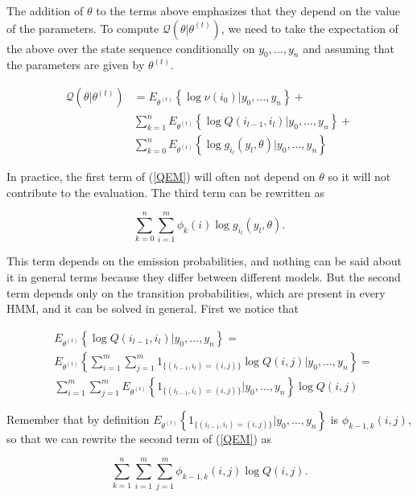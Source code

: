 \documentclass[12pt]{article}
\begin{document}
\begin{appendices}
    The addition of $\theta$ to the terms above emphasizes that they
    depend on the value of the parameters. To compute
    $\mathcal{Q}(\theta|\theta^{(t)})$, we need to take the
    expectation of the above over the state sequence
    conditionally on $y_0, \ldots, y_n$ and assuming that the parameters
    are given by $\theta^{(t)}$.

    \begin{align}
      \mathcal{Q}(\theta|\theta^{(t)}) &=
      E_{\theta^{(t)}} \left\{ \log \nu(i_0)
      \big| y_0, \ldots, y_n \right\} + \nonumber \\
      &\sum_{k=1}^n E_{\theta^{(t)}} \left\{
        \log Q(i_{l-1}, i_l)\big| y_0,
            \ldots, y_n \right\} + \label{QEM} \\
      &\sum_{k=0}^n E_{\theta^{(t)}} \left\{
        \log g_{i_l}(y_l, \theta) \big| y_0, \ldots, y_n \right\}
        \nonumber
    \end{align}

    In practice, the first term of (\ref{QEM}) will often not depend
    on $\theta$ so it will not contribute to the evaluation.
    The third term can be rewritten as

    $$\sum_{k=0}^n\sum_{i=1}^m \phi_k(i) \log g_{i_l}(y_l, \theta).$$

    This term depends on the emission probabilities, and nothing
    can be said about it in general terms because they differ
    between different models. But the second term depends only on
    the transition probabilities, which are present in every HMM,
    and it can be solved in general. First we notice that

    \begin{align*}
      &E_{\theta^{(t)}} \left\{ \log Q(i_{l-1}, i_l)
      \big| y_0, \ldots, y_n \right\} = \\
      &E_{\theta^{(t)}} \left\{ \sum_{i=1}^m\sum_{j=1}^m 
      1_{\{(i_{l-1}, i_l) = (i,j)\}} \log Q(i,j)
      \big| y_0, \ldots, y_n \right\} = \\
      &\sum_{i=1}^m\sum_{j=1}^m E_{\theta^{(t)}} \left\{
      1_{\{(i_{l-1}, i_l) = (i,j)\}} \big| y_0, \ldots, y_n \right\}
      \log Q(i,j)
    \end{align*}

    Remember that by definition $E_{\theta^{(t)}} \left\{
    1_{\{(i_{l-1}, i_l) = (i,j)\}} \big| y_0, \ldots, y_n \right\}$
    is $\phi_{k-1,k}(i,j)$, so that we can rewrite the second term
    of (\ref{QEM}) as

    $$ \sum_{k=1}^n\sum_{i=1}^m\sum_{j=1}^m \phi_{k-1,k}(i,j)
      \log Q(i,j). $$


\end{appendices}
\end{document}
